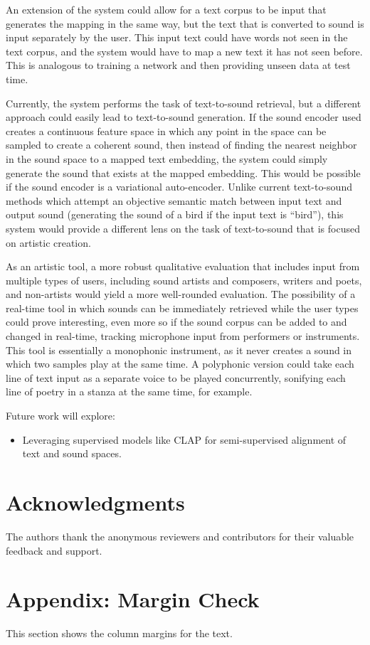 \documentclass[twoside,a4paper]{article}
\begin{document}
An extension of the system could allow for a text corpus to be input that generates the mapping in the same way, but the text that is converted to sound is input separately by the user. This input text could have words not seen in the text corpus, and the system would have to map a new text it has not seen before. This is analogous to training a network and then providing unseen data at test time.

Currently, the system performs the task of text-to-sound retrieval, but a different approach could easily lead to text-to-sound generation. If the sound encoder used creates a continuous feature space in which any point in the space can be sampled to create a coherent sound, then instead of finding the nearest neighbor in the sound space to a mapped text embedding, the system could simply generate the sound that exists at the mapped embedding. This would be possible if the sound encoder is a variational auto-encoder. Unlike current text-to-sound methods which attempt an objective semantic match between input text and output sound (generating the sound of a bird if the input text is ``bird''), this system would provide a different lens on the task of text-to-sound that is focused on artistic creation.

As an artistic tool, a more robust qualitative evaluation that includes input from multiple types of users, including sound artists and composers, writers and poets, and non-artists would yield a more well-rounded evaluation. The possibility of a real-time tool in which sounds can be immediately retrieved while the user types could prove interesting, even more so if the sound corpus can be added to and changed in real-time, tracking microphone input from performers or instruments. This tool is essentially a monophonic instrument, as it never creates a sound in which two samples play at the same time. A polyphonic version could take each line of text input as a separate voice to be played concurrently, sonifying each line of poetry in a stanza at the same time, for example. 



Future work will explore:
\begin{itemize}
    \item Leveraging supervised models like CLAP for semi-supervised alignment of text and sound spaces.
\end{itemize}

\section{Acknowledgments}
The authors thank the anonymous reviewers and contributors for their valuable feedback and support.

\nocite{*}


\section{Appendix: Margin Check}
This section shows the column margins for the text. \bigskip\newline
\end{document}
